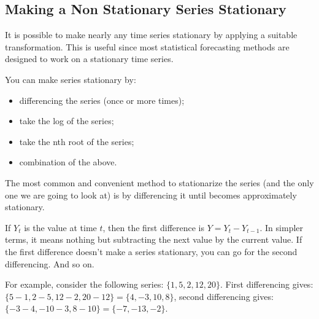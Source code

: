 \subsection{Making a Non Stationary Series Stationary}
\label{making-a-non-stationary-series-stationary}

It is possible to make nearly any time series stationary by applying a suitable transformation. This is useful since most statistical forecasting methods are designed to work on a stationary time series.

You can make series stationary by:

\begin{itemize}
\tightlist
\item
  differencing the series (once or more times);
\item
  take the log of the series;
\item
  take the nth root of the series;
\item
  combination of the above.
\end{itemize}

The most common and convenient method to stationarize the series (and the only one we are going to look at) is by differencing it until becomes approximately stationary.

If \(Y_t\) is the value at time \(t\), then the first difference is \(Y = Y_t - Y_{t-1}\). In simpler terms, it means
nothing but subtracting the next value by the current value. If the first difference doesn't make a series stationary, you can go for the second differencing. And so on.

For example, consider the following series: $\{1, 5, 2, 12, 20\}$.
First differencing gives: $\{5-1, 2-5, 12-2, 20-12\} = \{4, -3, 10, 8\}$,
second differencing gives: $\{-3-4, -10-3, 8-10\} = \{-7, -13, -2\}$.

